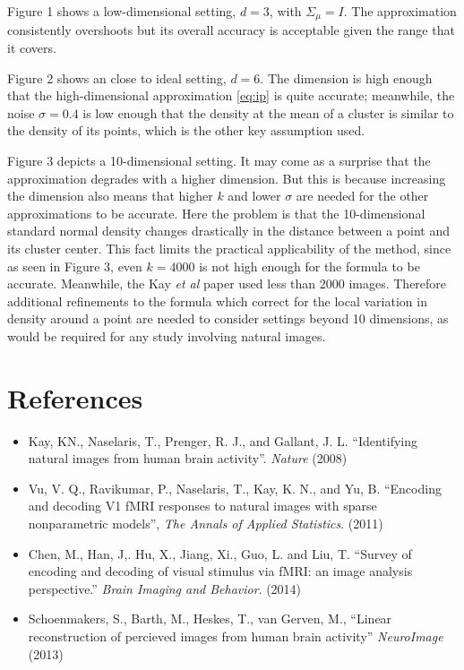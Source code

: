 \documentclass[11pt]{article}
\begin{document}
Figure 1 shows a low-dimensional setting, $d = 3$, with $\Sigma_\mu =
I$.  The approximation consistently overshoots but its overall
accuracy is acceptable given the range that it covers.

Figure 2 shows an close to ideal setting, $d = 6$.  The dimension is
high enough that the high-dimensional approximation \eqref{eq:ip} is
quite accurate; meanwhile, the noise $\sigma = 0.4$ is low enough that
the density at the mean of a cluster is similar to the density of its
points, which is the other key assumption used.

Figure 3 depicts a 10-dimensional setting.  It may come as a surprise
that the approximation degrades with a higher dimension.  But
this is because increasing the dimension also means that higher $k$
and lower $\sigma$ are needed for the other approximations to be
accurate.  Here the problem is that the 10-dimensional standard normal
density changes drastically in the distance between a point and its
cluster center.  This fact limits the practical applicability of the
method, since as seen in Figure 3, even $k = 4000$ is not high enough
for the formula to be accurate.  Meanwhile, the Kay \emph{et al} paper
used less than 2000 images.  Therefore additional refinements to the
formula which correct for the local variation in density around a point
are needed to consider settings beyond 10 dimensions, as would be
required for any study involving natural images.

\section{References}

\begin{itemize}
\item Kay, KN., Naselaris, T., Prenger, R. J., and Gallant, J. L.
  ``Identifying natural images from human brain
  activity''. \emph{Nature} (2008)
\item Vu, V. Q., Ravikumar, P., Naselaris, T., Kay, K. N., and Yu, B.
  ``Encoding and decoding V1 fMRI responses to natural images with
  sparse nonparametric models'', \emph{The Annals of Applied
    Statistics}. (2011)
\item Chen, M., Han, J,. Hu, X., Jiang, Xi., Guo, L. and Liu, T.
  ``Survey of encoding and decoding of visual stimulus via fMRI: an
  image analysis perspective.'' \emph{Brain Imaging and
    Behavior}. (2014)
\item Schoenmakers, S., Barth, M., Heskes, T., van Gerven, M.,
  ``Linear reconstruction of percieved images from human brain
  activity'' \emph{NeuroImage} (2013)
\end{itemize}
\end{document}
